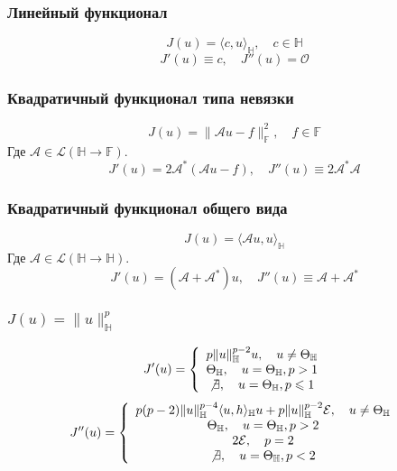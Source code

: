 \documentclass[A4]{article}
\begin{document}
\subsubsection{Линейный функционал}
\begin{equation*}
J(u)=\langle c,u\rangle_{\mathbb{H}},\quad c\in\mathbb{H}
\end{equation*}
\begin{equation*}
J'(u)\equiv c,\quad J''(u)=\mathcal{O}
\end{equation*}
\subsubsection{Квадратичный функционал типа невязки}
\begin{equation*}
J(u)=\|\mathcal{A}u-f\|^2_{\mathbb{F}},\quad f\in\mathbb{F}
\end{equation*}
Где $\mathcal{A}\in\mathcal{L}(\mathbb{H}\rightarrow\mathbb{F})$.
\begin{equation*}
J'(u)=2\mathcal{A}^*(\mathcal{A}u-f),\quad J''(u)\equiv 2\mathcal{A}^*\mathcal{A}
\end{equation*}
\subsubsection{Квадратичный функционал общего вида}
\begin{equation*}
J(u)=\langle\mathcal{A}u,u\rangle_{\mathbb{H}}
\end{equation*}
Где $\mathcal{A}\in\mathcal{L}(\mathbb{H}\rightarrow\mathbb{H})$.
\begin{equation*}
J'(u)=(\mathcal{A}+\mathcal{A}^*)u,\quad J''(u)\equiv \mathcal{A}+\mathcal{A}^*
\end{equation*}
\subsubsection{$J(u)=\|u\|^p_{\mathbb{H}}$}
\begin{equation*}
J'(u)=\left\{\begin{array}{cc}
p\|u\|^{p-2}_{\mathbb{H}}u,\quad u\ne\Theta_{\mathbb{H}}\\
\Theta_{\mathbb{H}},\quad u=\Theta_{\mathbb{H}},p>1\\
\not\exists,\quad u=\Theta_{\mathbb{H}},p\leqslant 1
\end{array}\right.
\end{equation*}
\begin{equation*}
J''(u)=\left\{\begin{array}{cc}
	p(p-2)\|u\|^{p-4}_{\mathbb{H}}\langle u,h\rangle_{\mathbb{H}}u+p\|u\|^{p-2}_{\mathbb{H}}\mathcal{E},\quad u\ne\Theta_{\mathbb{H}}\\
	\Theta_{\mathbb{H}},\quad u=\Theta_{\mathbb{H}},p>2\\
	2\mathcal{E},\quad p=2\\
	\not\exists,\quad u=\Theta_{\mathbb{H}},p<2\\
\end{array}\right.
\end{equation*}
\end{document}
